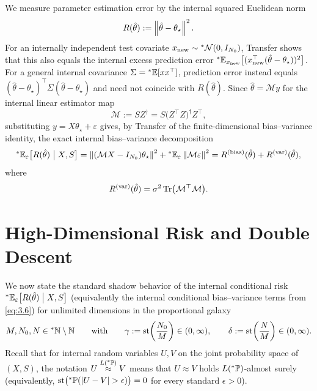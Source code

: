 We measure parameter estimation error by the internal squared Euclidean norm
\begin{equation}\label{eq:3.4}
R(\hat{\theta}) := \left\lVert \hat{\theta} - \theta_\star \right\rVert^2.
\end{equation}
For an internally independent test covariate $x_{\mathrm{new}} \sim {}^*\mathcal{N}(0, I_{N_0})$, Transfer shows that this also equals the internal excess prediction error ${}^*\mathbb{E}_{x_{\mathrm{new}}}\bigl[(x_{\mathrm{new}}^\top(\hat{\theta} - \theta_\star))^2\bigr]$. For a general internal covariance $\Sigma = {}^*\mathbb{E}[xx^\top]$, prediction error instead equals $(\hat{\theta} - \theta_\star)^\top \Sigma (\hat{\theta} - \theta_\star)$ and need not coincide with $R(\hat{\theta})$. Since $\hat{\theta} = \mathcal{M}y$ for the internal linear estimator map
\begin{equation}\label{eq:3.5}
\mathcal{M} := SZ^\dagger = S\bigl(Z^\top Z\bigr)^\dagger Z^\top,
\end{equation}
substituting $y = X\theta_\star + \varepsilon$ gives, by Transfer of the finite-dimensional bias--variance identity, the exact internal bias--variance decomposition
\begin{equation}\label{eq:3.6}
{}^*\mathbb{E}_\varepsilon\bigl[R(\hat{\theta}) \;\big|\; X, S\bigr] = \left\lVert (\mathcal{M}X - I_{N_0})\theta_\star \right\rVert^2 + {}^*\mathbb{E}_\varepsilon\left\lVert \mathcal{M}\varepsilon \right\rVert^2 = R^{(\mathrm{bias})}(\hat{\theta}) + R^{(\mathrm{var})}(\hat{\theta}),
\end{equation}
where
\begin{equation}\label{eq:3.7}
R^{(\mathrm{var})}(\hat{\theta}) = \sigma^2 \operatorname{Tr}\bigl(\mathcal{M}^\top \mathcal{M}\bigr).
\end{equation}

\section{High-Dimensional Risk and Double Descent}
\label{sec:3.3}

We now state the standard shadow behavior of the internal conditional risk ${}^*\mathbb{E}_\varepsilon\bigl[R(\hat{\theta}) \;\big|\; X, S\bigr]$ (equivalently the internal conditional bias--variance terms from \eqref{eq:3.6}) for unlimited dimensions in the proportional galaxy
\begin{equation}\label{eq:3.8}
M, N_0, N \in {}^*\mathbb{N} \setminus \mathbb{N} \qquad \text{with} \qquad \gamma := \operatorname{st}\!\left(\frac{N_0}{M}\right) \in (0, \infty), \qquad \delta := \operatorname{st}\!\left(\frac{N}{M}\right) \in (0, \infty).
\end{equation}
Recall that for internal random variables $U, V$ on the joint probability space of $(X, S)$, the notation $U \stackrel{L({}^*\mathbb{P})}{\approx} V$ means that $U \approx V$ holds $L({}^*\mathbb{P})$-almost surely (equivalently, $\operatorname{st}\bigl({}^*\mathbb{P}(\left\lvert U - V \right\rvert > \epsilon)\bigr) = 0$ for every standard $\epsilon > 0$).

